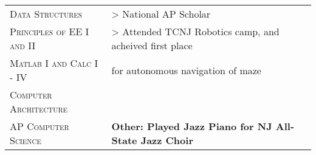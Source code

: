 \documentclass[a4paper, oneside, final]{scrartcl} %
\newcommand{\gray}{\rowcolor[gray]{.90}} %
\begin{document}
\begin{center}
\begin{tabularx}{0.97\linewidth}{>{\raggedleft\scshape}l|X}
    Data Structures &> National AP Scholar \\
    Principles of EE I and II &> Attended TCNJ Robotics camp, and acheived first place\\ 
    Matlab I and Calc I - IV& \hspace{1cm} for autonomous navigation of maze\\
    Computer Architecture &\\
    AP Computer Science & \bf{Other:} Played Jazz Piano for NJ All-State Jazz Choir \\

\end{tabularx}





\end{center}
\end{document}
